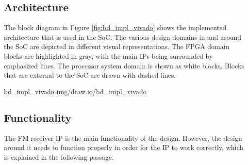 \subsection{Architecture}

The block diagram in Figure \ref{fig:bd_impl_vivado} shows the implemented architecture that is used in the SoC.
The various design domains in and around the SoC are depicted in different visual representations.
The FPGA domain blocks are highlighted in gray, with the main IPs being surrounded by emphasized lines.
The processor system domain is shown as white blocks.
Blocks that are external to the SoC are drawn with dashed lines.

 {bd_impl_vivado} {img/draw.io/bd_impl_vivado}

\subsection{Functionality}

The FM receiver IP is the main functionality of the design.
However, the design around it needs to function properly in order for the IP to work correctly, which is explained in the following passage.\\

